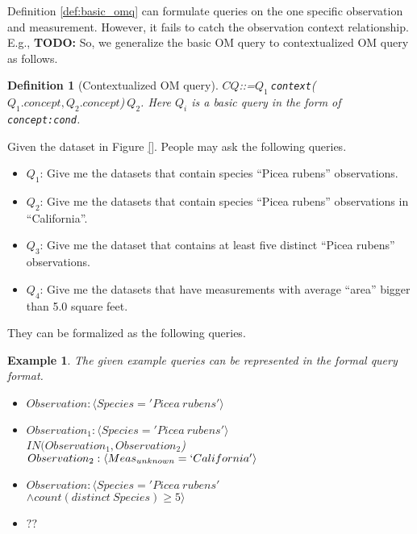 \documentclass[conference]{IEEEtran}
\newtheorem{example}{Example}[section]
\newtheorem{definition}{Definition}[section]
\begin{document}
Definition \ref{def:basic_omq} can formulate queries on the
one specific observation and measurement. 
However, it fails to catch the observation context relationship. 
E.g., {\bf TODO: }
So, we generalize the basic OM query to contextualized OM query as
follows. 

\begin{definition}[Contextualized OM query]\label{def:context_omq}
$CQ$::=$Q_1~${\tt context}($Q_1.concept, Q_2.concept$)$~Q_2$. Here $Q_i$ is a basic query
in the form of {\tt concept:cond}. 
\end{definition}

Given the dataset in Figure \ref{}. 
People may ask the following queries. 

\begin{itemize}
\item $Q_1$: Give me the datasets that contain species ``Picea rubens'' observations.
\item $Q_2$: Give me the datasets that contain species ``Picea rubens''
  observations in ``California''. 
\item $Q_3$: Give me the dataset that contains at least five distinct ``Picea rubens'' observations.
\item $Q_4$: Give me the datasets that have measurements with average ``area''
bigger than 5.0 square feet. 
\end{itemize}

They can be formalized as the following queries. 

\begin{example}
The given example queries can be represented in the formal query
format. 
\begin{itemize}
\item $Observation: \langle Species='Picea~rubens'\rangle$
\item $Observation_1: \langle Species='Picea~rubens'\rangle$\\
  $IN(Observation_1, Observation_2$) \\
$Observation_2: \langle Meas_{unknown}=`California'\rangle$
\item $Observation: \langle Species='Picea~rubens' $\\
$\wedge
  count(distinct~Species)\geq 5\rangle$
\item $??$
\end{itemize}

\end{example}
\end{document}
